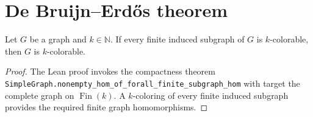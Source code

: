 \section{De Bruijn--Erd\H{o}s theorem}

\begin{theorem}
\label{thm:debruijn-erdos}
\leanok
Let $G$ be a graph and $k\in\mathbb N$. If every finite induced subgraph of $G$ is $k$-colorable, then $G$ is $k$-colorable.
\end{theorem}

\begin{proof}
\leanok
The Lean proof invokes the compactness theorem \texttt{SimpleGraph.nonempty\_hom\_of\_forall\_finite\_subgraph\_hom} with target the complete graph on $\operatorname{Fin}(k)$. A $k$-coloring of every finite induced subgraph provides the required finite graph homomorphisms.
\end{proof}
